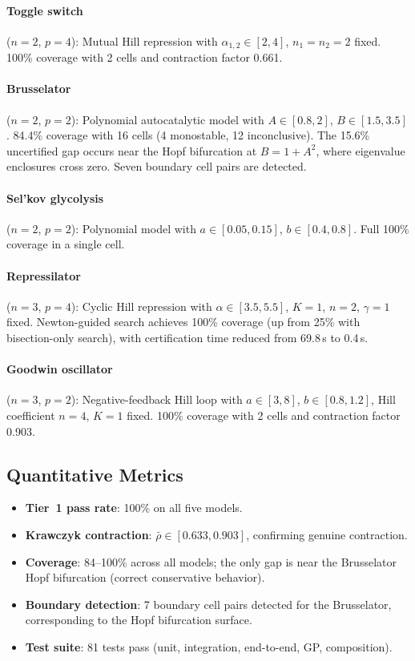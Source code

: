 \documentclass[11pt]{article}
\begin{document}
\paragraph{Toggle switch} ($n{=}2$, $p{=}4$): Mutual Hill repression with $\alpha_{1,2} \in [2,4]$, $n_1{=}n_2{=}2$ fixed.
100\% coverage with 2 cells and contraction factor 0.661.

\paragraph{Brusselator} ($n{=}2$, $p{=}2$): Polynomial autocatalytic model with $A \in [0.8, 2]$, $B \in [1.5, 3.5]$.
84.4\% coverage with 16 cells (4 monostable, 12 inconclusive).
The 15.6\% uncertified gap occurs near the Hopf bifurcation at $B = 1 + A^2$, where eigenvalue enclosures cross zero.
Seven boundary cell pairs are detected.

\paragraph{Sel'kov glycolysis} ($n{=}2$, $p{=}2$): Polynomial model with $a \in [0.05, 0.15]$, $b \in [0.4, 0.8]$.
Full 100\% coverage in a single cell.

\paragraph{Repressilator} ($n{=}3$, $p{=}4$): Cyclic Hill repression with $\alpha \in [3.5, 5.5]$, $K{=}1$, $n{=}2$, $\gamma{=}1$ fixed.
Newton-guided search achieves 100\% coverage (up from 25\% with bisection-only search), with certification time reduced from 69.8\,s to 0.4\,s.

\paragraph{Goodwin oscillator} ($n{=}3$, $p{=}2$): Negative-feedback Hill loop with $a \in [3, 8]$, $b \in [0.8, 1.2]$, Hill coefficient $n{=}4$, $K{=}1$ fixed.
100\% coverage with 2 cells and contraction factor 0.903.

\subsection{Quantitative Metrics}

\begin{itemize}[leftmargin=*]
\item \textbf{Tier~1 pass rate}: 100\% on all five models.
\item \textbf{Krawczyk contraction}: $\bar{\rho} \in [0.633, 0.903]$, confirming genuine contraction.
\item \textbf{Coverage}: 84--100\% across all models; the only gap is near the Brusselator Hopf bifurcation (correct conservative behavior).
\item \textbf{Boundary detection}: 7 boundary cell pairs detected for the Brusselator, corresponding to the Hopf bifurcation surface.
\item \textbf{Test suite}: 81 tests pass (unit, integration, end-to-end, GP, composition).
\end{itemize}
\end{document}
